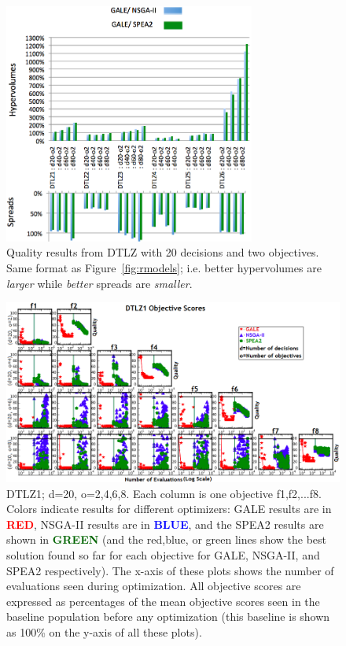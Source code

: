 \documentclass[10pt,journal,compsoc]{IEEEtran}
\newcommand{\fig}[1]{Figure~\ref{fig:#1}}
\newenvironment{changed}{\par}{\par}
\begin{document}
\begin{changed}
\begin{figure}
\includegraphics[width=3.25in]{dtlzResults1.png}
\caption{Quality results from DTLZ with 20 decisions and two objectives.
Same format as \fig{rmodels}; i.e. better hypervolumes are {\em larger} while {\em better} spreads are {\em smaller}.}\label{fig:dtlz}
\end{figure}
\begin{figure}[!t]
\includegraphics[width=6.5in]{dtlzResults2.png}
\caption{DTLZ1; d=20, o=2,4,6,8.
Each column is one objective f1,f2,...f8. Colors indicate results
for different optimizers:
GALE results are in 
\textcolor{red}{{\bf RED}},
NSGA-II results are in 
 \textcolor{blue}{{\bf BLUE}},
and the SPEA2 results are shown in 
  \textcolor{darkgreen}{{\bf GREEN}}
(and the 
red,blue, or green lines show the best solution found so far for each
objective for GALE, NSGA-II, and SPEA2 respectively). 
The x-axis of these
plots shows the number of evaluations seen during optimization.
All objective scores are expressed as percentages
of the mean objective scores seen in the baseline population before any optimization
(this baseline is shown as 100\% on the y-axis of all these plots). 
}
\end{figure}
\end{changed}
\end{document}
